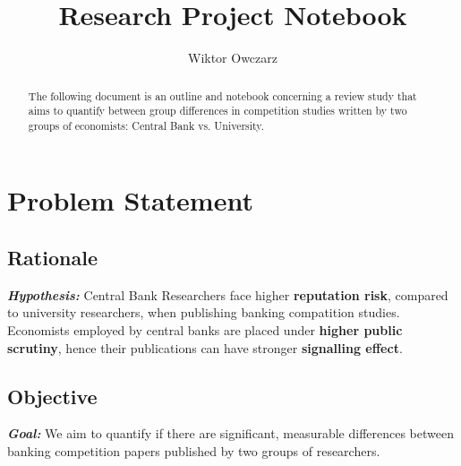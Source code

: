 \documentclass{article}
\title{\vspace{-2.5cm} \textbf{Research Project Notebook}}
\author{Wiktor Owczarz}
\begin{document}
\maketitle

\begin{minipage}{0.8\textwidth}
\begin{abstract}
   The following document is an outline and notebook concerning a review study that aims to quantify between group differences in competition studies written by two groups of economists: Central Bank  vs. University.
\end{abstract}
\end{minipage}

\section{Problem Statement}

\subsection*{Rationale}

\textbf{\textit{Hypothesis:}} Central Bank Researchers face higher \textbf{reputation risk}, compared to university researchers, when publishing banking compatition studies. Economists employed by central banks are placed under \textbf{higher public scrutiny}, hence their publications can have stronger \textbf{signalling effect}.\\


\subsection*{Objective}
\textbf{\textit{Goal:}} We aim to quantify if there are significant, measurable differences between banking competition papers published by two groups of researchers. \\
\end{document}
